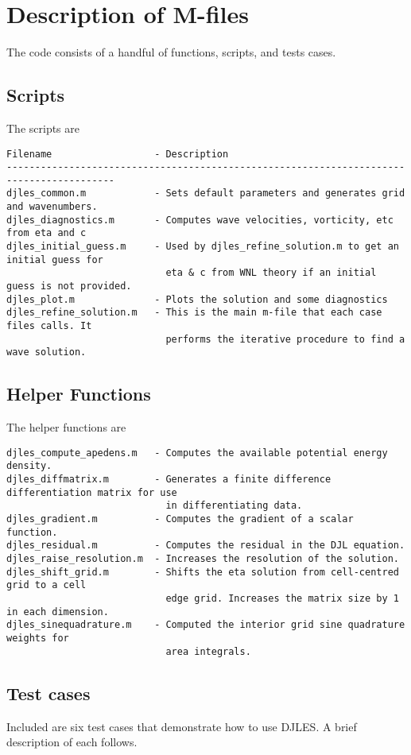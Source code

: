 \documentclass[letterpaper]{article}
\begin{document}
\section{Description of M-files}
The code consists of a handful of functions, scripts, and tests cases.

\subsection{Scripts}
The scripts are
\begin{verbatim}
Filename                  - Description
-----------------------------------------------------------------------------------------
djles_common.m            - Sets default parameters and generates grid and wavenumbers.
djles_diagnostics.m       - Computes wave velocities, vorticity, etc from eta and c
djles_initial_guess.m     - Used by djles_refine_solution.m to get an initial guess for
                            eta & c from WNL theory if an initial guess is not provided.
djles_plot.m              - Plots the solution and some diagnostics
djles_refine_solution.m   - This is the main m-file that each case files calls. It
                            performs the iterative procedure to find a wave solution.
\end{verbatim}

\subsection{Helper Functions}
The helper functions are
\begin{verbatim}
djles_compute_apedens.m   - Computes the available potential energy density.
djles_diffmatrix.m        - Generates a finite difference differentiation matrix for use
                            in differentiating data.
djles_gradient.m          - Computes the gradient of a scalar function.
djles_residual.m          - Computes the residual in the DJL equation.
djles_raise_resolution.m  - Increases the resolution of the solution.
djles_shift_grid.m        - Shifts the eta solution from cell-centred grid to a cell
                            edge grid. Increases the matrix size by 1 in each dimension.
djles_sinequadrature.m    - Computed the interior grid sine quadrature weights for
                            area integrals.
\end{verbatim}

\subsection{Test cases}
Included are six test cases that demonstrate how to use DJLES. A brief description of each follows.
\end{document}
